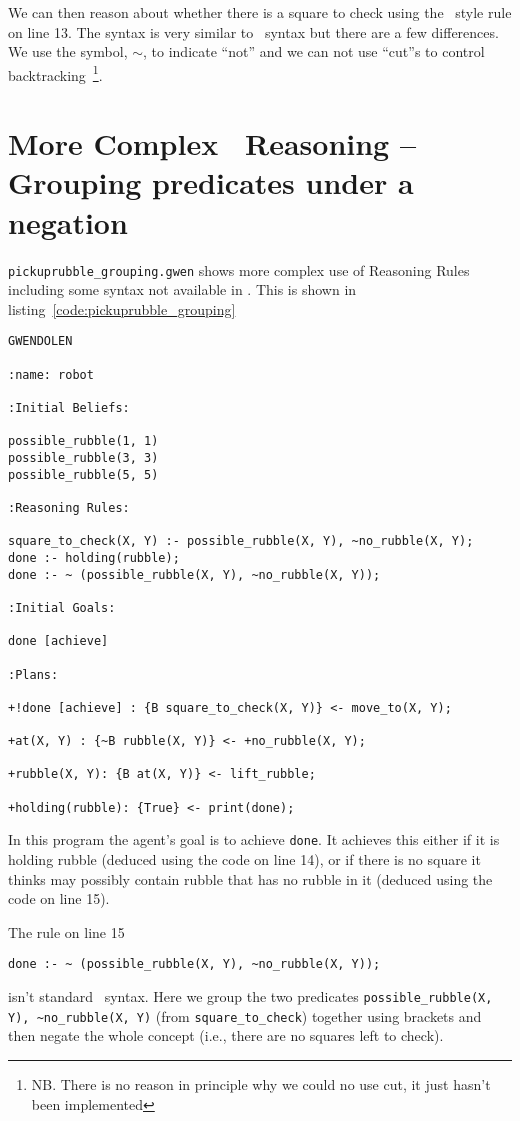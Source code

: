 \documentclass[a4]{article}
\begin{document}
We can then reason about whether there is a square to check using the \prolog\ style rule on line 13.  The syntax is very similar to \prolog\ syntax but there are a few differences.  We use the symbol, $\sim$, to indicate ``not'' and we can not use ``cut''s to control backtracking~\footnote{NB.  There is no reason in principle why we could no use cut, it just hasn't been implemented}.

\section{More Complex \prolog\ Reasoning -- Grouping predicates under a negation}

\texttt{pickuprubble\_grouping.gwen} shows more complex use of Reasoning Rules including some syntax not available in \prolog.  This is shown in listing~\ref{code:pickuprubble_grouping}
\begin{lstlisting}[float,caption=Pick Up Rubble (More Complex Reasoning Rules),basicstyle=\sffamily,style=easslisting,language=Gwendolen,label=code:pickuprubble_grouping]
GWENDOLEN

:name: robot

:Initial Beliefs:

possible_rubble(1, 1)
possible_rubble(3, 3)
possible_rubble(5, 5)

:Reasoning Rules:

square_to_check(X, Y) :- possible_rubble(X, Y), ~no_rubble(X, Y);
done :- holding(rubble);
done :- ~ (possible_rubble(X, Y), ~no_rubble(X, Y));

:Initial Goals:

done [achieve]

:Plans:

+!done [achieve] : {B square_to_check(X, Y)} <- move_to(X, Y);

+at(X, Y) : {~B rubble(X, Y)} <- +no_rubble(X, Y);

+rubble(X, Y): {B at(X, Y)} <- lift_rubble;

+holding(rubble): {True} <- print(done);
\end{lstlisting}

In this program the agent's goal is to achieve \lstinline{done}.  It achieves this either if it is holding rubble (deduced using the code on line 14), or if there is no square it thinks may possibly contain rubble that has no rubble in it (deduced using the code on line 15).

\begin{sloppypar}
The rule on line 15
\begin{verbatim}
done :- ~ (possible_rubble(X, Y), ~no_rubble(X, Y));
\end{verbatim}
isn't standard \prolog\ syntax.  Here we group the two predicates \lstinline{possible_rubble(X, Y), ~no_rubble(X, Y)} (from \lstinline{square_to_check}) together using brackets and then negate the whole concept (i.e., there are no squares left to check).
\end{sloppypar}
\end{document}
